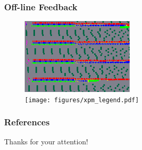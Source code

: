 \documentclass[10pt,a4paper]{beamer}
\begin{document}
\begin{frame}
\frametitle{Off-line Feedback}
\begin{figure}
  \center
  \includegraphics[width=0.6\linewidth]{figures/locality_attila_ws_zoom.png} \\
  \vfill
  \texttt{[image: figures/xpm\_legend.pdf]}
\end{figure}
\end{frame}

\begin{frame}
  \frametitle{References}
\printbibliography
\end{frame}

\begin{frame}
  \Huge{\centerline{Thanks for your attention!}}
\end{frame}
\end{document}
